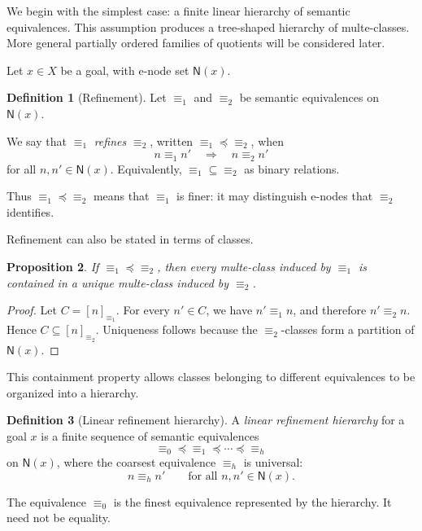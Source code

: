 \documentclass[sigconf,nonacm]{acmart}
\theoremstyle{definition}
\newtheorem{definition}{Definition}[section]
\theoremstyle{plain}
\newtheorem{proposition}[definition]{Proposition}
\theoremstyle{remark}
\begin{document}
We begin with the simplest case: a finite linear hierarchy of semantic
equivalences.  This assumption produces a tree-shaped hierarchy of
multe-classes.  More general partially ordered families of quotients
will be considered later.

Let \(x\in X\) be a goal, with e-node set \(\mathsf{N}(x)\).

\begin{definition}[Refinement]
Let \(\equiv_1\) and \(\equiv_2\) be semantic equivalences on
\(\mathsf{N}(x)\).

We say that \(\equiv_1\) \emph{refines} \(\equiv_2\), written
\(\equiv_1 \preceq \equiv_2\), when
\[
n\equiv_1 n'
\quad\Longrightarrow\quad
n\equiv_2 n'
\]
for all \(n,n'\in\mathsf{N}(x)\).  Equivalently,
\({\equiv_1}\subseteq{\equiv_2}\) as binary relations.
\end{definition}

Thus \(\equiv_1\preceq\equiv_2\) means that \(\equiv_1\) is finer:
it may distinguish e-nodes that \(\equiv_2\) identifies.

Refinement can also be stated in terms of classes.

\begin{proposition}
If \(\equiv_1\preceq\equiv_2\), then every multe-class induced by
\(\equiv_1\) is contained in a unique multe-class induced by
\(\equiv_2\).
\end{proposition}

\begin{proof}
Let \(C=[n]_{\equiv_1}\).
For every \(n'\in C\), we have \(n'\equiv_1 n\), and therefore
\(n'\equiv_2 n\).  Hence \(C\subseteq[n]_{\equiv_2}\).
Uniqueness follows because the \(\equiv_2\)-classes form a partition of
\(\mathsf{N}(x)\).
\end{proof}

This containment property allows classes belonging to different
equivalences to be organized into a hierarchy.

\begin{definition}[Linear refinement hierarchy]
A \emph{linear refinement hierarchy} for a goal \(x\) is a finite
sequence of semantic equivalences
\[
\equiv_0
\preceq
\equiv_1
\preceq
\cdots
\preceq
\equiv_h
\]
on \(\mathsf{N}(x)\), where the coarsest equivalence
\(\equiv_h\) is universal:
\[
n\equiv_h n'
\qquad
\text{for all }n,n'\in\mathsf{N}(x).
\]

The equivalence \(\equiv_0\) is the finest equivalence represented by
the hierarchy.
It need not be equality.
\end{definition}
\end{document}
